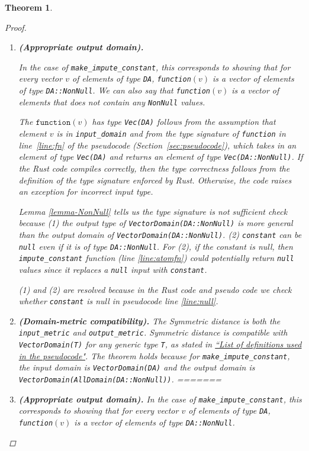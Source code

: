 \documentclass[11pt,a4paper]{article}
\newtheorem{theorem}{Theorem}[section]
\newcommand{\grace}[1]{{ {\color{purple}{(grace)~#1}}}}
\newcommand{\function}{\texttt{function}}
\begin{document}
\begin{theorem}
\begin{proof}
\begin{enumerate}
\item \textbf{(Appropriate output domain).} 
\grace{Things to confirm: (1) is the type signature correct (input and output type)? The input and output domain correct? (2) What is the reason the type signature is not sufficient? Is it because the output type is more general than the output domain? Or is it theoretically because constant can be null value even if it has the type DA::NonNull? (3) so, is it correct that a variable with type DA::NonNull can contain null values?}


In the case of \texttt{make\_impute\_constant}, this corresponds to showing that for every vector $v$ of elements of type \texttt{DA},  \texttt{function}$(v)$ is a vector of elements of type \texttt{DA::NonNull}. We can also say that \texttt{function}$(v)$ is a vector of elements that does not contain any \texttt{NonNull} values.

The $\function(v)$ has type \texttt{Vec(DA)} follows from the assumption that element $v$ is in \texttt{input\_domain} and from the type signature of \texttt{function} in line~\ref{line:fn} of the pseudocode (Section~\ref{sec:pseudocode}), which takes in an element of type \texttt{Vec(DA)} and returns an element of type \texttt{Vec(DA::NonNull)}. If the Rust code compiles correctly, then the type correctness follows from the definition of the type signature enforced by Rust. Otherwise, the code raises an exception for incorrect input type. 

Lemma \ref{lemma-NonNull} tells us the type signature is not sufficient check because (1) the output type of \texttt{VectorDomain(DA::NonNull)} is more general than the output domain of \texttt{VectorDomain(DA::NonNull)}. \grace{?? The output type matches the output domain I wrote, so something's wrong.} (2) \texttt{constant} can be \texttt{null} even if it is of type \texttt{DA::NonNull}. For (2), if the constant is null, then \texttt{impute\_constant} function (line \ref{line:atomfn}) could potentially return \texttt{null} values since it replaces a \texttt{null} input with \texttt{constant}.


(1) and (2) are resolved because in the Rust code and pseudo code we check whether \texttt{constant} is null in pseudocode line \ref{line:null}.

\item \textbf{(Domain-metric compatibility).} The Symmetric distance is both the \texttt{input\_metric} and \texttt{output\_metric}. Symmetric distance is compatible with \texttt{VectorDomain(T)} for any generic type \texttt{T}, as stated in \href{https://www.overleaf.com/project/60d215bf90b337ac02200a99}{``List of definitions used in the pseudocode"}. The theorem holds because for \texttt{make\_impute\_constant}, the input domain is \texttt{VectorDomain(DA)} and the output domain is \texttt{VectorDomain(AllDomain(DA::NonNull))}. 
=======
\item \textbf{(Appropriate output domain).} 
In the case of \texttt{make\_impute\_constant}, this corresponds to showing that for every vector $v$ of elements of type \texttt{DA}, \texttt{function}$(v)$ is a vector of elements of type \texttt{DA::NonNull}.


\end{enumerate}
\end{proof}
\end{theorem}
\end{document}
